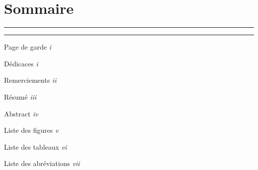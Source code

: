 \documentclass[12pt,a4paper]{report}
\begin{document}
	
	\chapter*{Sommaire}
	
	\vspace{0.5cm}
	
	{
		\noindent\textcolor{bleuPrincipal}{\rule{\linewidth}{0.8pt}}
		\vspace{2pt}
		
		
		\vspace{4pt}
		\noindent\textcolor{bleuPrincipal}{\rule{\linewidth}{0.4pt}}
	}
	
	\vspace{4pt}
	
	\begin{list}{}{%
			\setlength{\leftmargin}{0pt}
			\setlength{\itemsep}{4pt}
		}
		\item \hspace{0pt} Page de garde \dotfill \textit{i}
		\item \hspace{0pt} D\'edicaces \dotfill \textit{i}
		\item \hspace{0pt} Remerciements \dotfill \textit{ii}
		\item \hspace{0pt} R\'esum\'e \dotfill \textit{iii}
		\item \hspace{0pt} Abstract \dotfill \textit{iv}
		\item \hspace{0pt} Liste des figures \dotfill \textit{v}
		\item \hspace{0pt} Liste des tableaux \dotfill \textit{vi}
		\item \hspace{0pt} Liste des abr\'eviations \dotfill \textit{vii}
	\end{list}
	
	\vspace{0.6cm}
	
	
\end{document}
